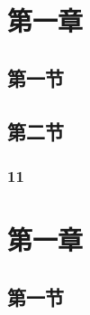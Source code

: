 \documentclass{xdyy-notes}
\begin{document}
\maketitle

\frontmatter

\begin{preface}
  \zhlipsum[1-3]
\end{preface}


\tableofcontents

\mainmatter

\chapter{第一章}

\section{第一节}


\zhlipsum[1-6]



\section{第二节}


\subsection{11}


\zhlipsum[1-2]



\chapter{第一章}

\section{第一节}
\end{document}
